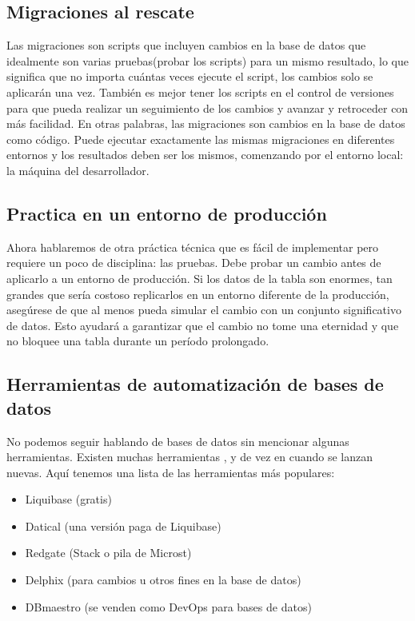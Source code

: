 \documentclass[twoside,twocolumn]{article}
\begin{document}
\subsection{Migraciones al rescate}
Las migraciones son scripts que incluyen cambios en la base de datos que idealmente son varias pruebas(probar los scripts) para un mismo resultado, lo que significa que no importa cuántas veces ejecute el script, los cambios solo se aplicarán una vez. También es mejor tener los scripts en el control de versiones para que pueda realizar un seguimiento de los cambios y avanzar y retroceder con más facilidad.
En otras palabras, las migraciones son cambios en la base de datos como código. Puede ejecutar exactamente las mismas migraciones en diferentes entornos y los resultados deben ser los mismos, comenzando por el entorno local: la máquina del desarrollador.

\subsection{Practica en un entorno de producción}
Ahora hablaremos de otra práctica técnica que es fácil de implementar pero requiere un poco de disciplina:
las pruebas.
Debe probar un cambio antes de aplicarlo a un entorno de producción. Si los datos de la tabla son enormes, tan grandes que sería costoso replicarlos en un entorno diferente de la producción, asegúrese de que al menos pueda simular el cambio con un conjunto significativo de datos. Esto ayudará a garantizar que el cambio no tome una eternidad y que no bloquee una tabla durante un período prolongado.

\subsection{Herramientas de automatización de bases de datos}
No podemos seguir hablando de bases de datos sin mencionar algunas herramientas. Existen muchas herramientas , y de vez en cuando se lanzan nuevas. Aquí tenemos una lista de las herramientas más populares:
\begin{itemize}
\item Liquibase (gratis)
\item Datical (una versión paga de Liquibase)
\item Redgate (Stack o pila de Microst)
\item Delphix (para cambios u otros fines en la base de datos)
\item DBmaestro (se venden como DevOps para bases de datos)
\end{itemize}
\end{document}
